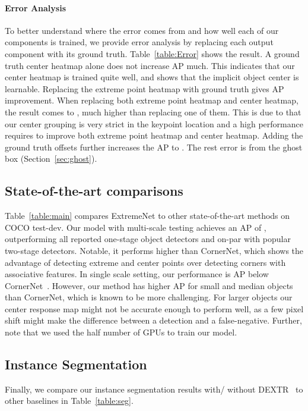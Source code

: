 \documentclass[10pt,twocolumn,letterpaper]{article}
\begin{document}
\paragraph{Error Analysis}
To better understand where the error comes from and how well each of our components is trained,
we provide error analysis by replacing each output component with its ground truth.
Table~\ref{table:Error} shows the result.
A ground truth center heatmap alone does not increase AP much. 
This indicates that our center heatmap is trained quite well, 
and shows that the implicit object center is learnable.
Replacing the extreme point heatmap with ground truth gives  AP improvement.
When replacing both extreme point heatmap and center heatmap, the result comes to , much higher than replacing one of them.
This is due to that our center grouping is very strict in the keypoint location and a high performance requires to improve both extreme point heatmap and center heatmap.
Adding the ground truth offsets further increases the AP to . The rest error is from the ghost box (Section~\ref{sec:ghost}).

\subsection{State-of-the-art comparisons}

Table~\ref{table:main} compares ExtremeNet to other state-of-the-art methods on COCO test-dev.
Our model with multi-scale testing achieves an AP of , outperforming all reported one-stage object detectors and on-par with popular two-stage detectors.
Notable, it performs  higher than CornerNet, which shows the advantage of detecting extreme and center points over detecting corners with associative features. 
In single scale setting, our performance is  AP below CornerNet~\cite{Law_2018_ECCV}.
However, our method has higher AP for small and median objects than CornerNet, which is known to be more challenging.
For larger objects our center response map might not be accurate enough to perform well, as a few pixel shift might make the difference between a detection and a false-negative.
Further, note that we used the half number of GPUs to train our model.

\subsection{Instance Segmentation}
Finally, we compare our instance segmentation results with/ without DEXTR~\cite{Man+18} to other baselines in Table~\ref{table:seg}.
\end{document}
